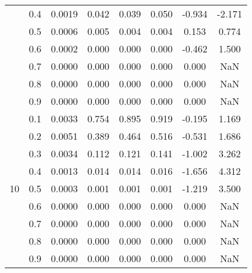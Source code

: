\documentclass[11pt,a4paper]{report}
\begin{document}
\begin{longtable}{ | c | c || c | c | c | c | c | c | }
 & 0.4 & 0.0019 & 0.042 & 0.039 & 0.050 & -0.934 & -2.171 \\
 & 0.5 & 0.0006 & 0.005 & 0.004 & 0.004 & 0.153 & 0.774 \\
 & 0.6 & 0.0002 & 0.000 & 0.000 & 0.000 & -0.462 & 1.500 \\
 & 0.7 & 0.0000 & 0.000 & 0.000 & 0.000 & 0.000 & NaN \\
 & 0.8 & 0.0000 & 0.000 & 0.000 & 0.000 & 0.000 & NaN \\
 & 0.9 & 0.0000 & 0.000 & 0.000 & 0.000 & 0.000 & NaN \\
 \hline
\multirow{9}{*}{10} & 0.1 & 0.0033 & 0.754 & 0.895 & 0.919 & -0.195 & 1.169 \\
 & 0.2 & 0.0051 & 0.389 & 0.464 & 0.516 & -0.531 & 1.686 \\
 & 0.3 & 0.0034 & 0.112 & 0.121 & 0.141 & -1.002 & 3.262 \\
 & 0.4 & 0.0013 & 0.014 & 0.014 & 0.016 & -1.656 & 4.312 \\
 & 0.5 & 0.0003 & 0.001 & 0.001 & 0.001 & -1.219 & 3.500 \\
 & 0.6 & 0.0000 & 0.000 & 0.000 & 0.000 & 0.000 & NaN \\
 & 0.7 & 0.0000 & 0.000 & 0.000 & 0.000 & 0.000 & NaN \\
 & 0.8 & 0.0000 & 0.000 & 0.000 & 0.000 & 0.000 & NaN \\
 & 0.9 & 0.0000 & 0.000 & 0.000 & 0.000 & 0.000 & NaN \\
 \hline
\hline
\end{longtable}
\end{document}
